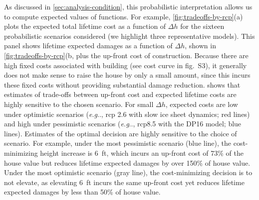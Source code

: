 \documentclass{agujournal2019}
\makeatletter
\DeclareRobustCommand\onedot{\futurelet\@let@token\@onedot}
\def\@onedot{\ifx\@let@token.\else.\null\fi\xspace}
\def\eg{\emph{e.g}\onedot} \def\Eg{\emph{E.g}\onedot}
\makeatother
\begin{document}
As discussed in \cref{sec:analysis-condition}, this probabilistic interpretation allows us to compute expected values of functions.
For example, \cref{fig:tradeoffs-by-rcp}(a) plots the expected total lifetime cost as a function of $\Delta h$ for the sixteen probabilistic scenarios considered (we highlight three representative models).
This panel shows lifetime expected damages as a function of $\Delta h$, shown in \cref{fig:tradeoffs-by-rcp}(b,  plus the up-front cost of construction.
Because there are high fixed costs associated with building (see cost curve in fig.~S3), it generally does not make sense to raise the house by only a small amount, since this incurs these fixed costs without providing substantial damage reduction.
 shows that estimates of trade-offs between up-front cost and expected lifetime costs are highly sensitive to the chosen scenario.
For small $\Delta h$, expected costs are low under optimistic scenarios (\eg, \gls{rcp} 2.6 with slow ice sheet dynamics; red lines) and high under pessimistic scenarios (\eg, \gls{rcp}8.5 with the DP16 model; blue lines).
Estimates of the optimal decision are highly sensitive to the choice of scenario.
For example, under the most pessimistic scenario (blue line), the cost-minimizing height increase is \SI{6}{ft}, which incurs an up-front cost of 73\% of the house value but reduces lifetime expected damages by over 150\% of house value.
Under the most optimistic scenario (gray line), the cost-minimizing decision is to not elevate, as elevating \SI{6}{ft} incurs the same up-front cost yet reduces lifetime expected damages by less than 50\% of house value.
\end{document}
